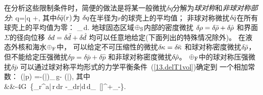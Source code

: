 在分析这些限制条件时，简便的做法是将某一般微扰$\delta q$分解为{\em 球对称\/}和{\em 非球对称部分\/}:
%
%
\eq
\delta\hspace{-0.1 mm}q=\delta\hspace{-0.1 mm}\bar{q}
+\delta\hspace{-0.1 mm},
\en
其中$\delta\hspace{-0.1 mm}\bar{q}(r)$为
$\delta\hspace{-0.1 mm}q$在半径为$r$的球壳上的平均值；
非球对称微扰$\delta\hspace{-0.1 mm}\hat{q}$在所有球壳上的平均值为零：
\eq
\int_{\Omega}\delta\hspace{-0.1 mm}\,d.
\en
地球固态区域$\earth_{\rm S}$内部的密度微扰
$\delta\hspace{-0.2 mm}\rho=\delta\hspace{-0.2 mm}\bar{\rho}
+\delta\hspace{-0.2 mm}\hat{\rho}$
和界面$\Sigma$的径向位移
$\delta\hspace{-0.1 mm}d=\delta\hspace{-0.1 mm}\bar{d}
+\delta\hspace{-0.1 mm}\hat{d}$
均可以任意地给定(下面列出的特殊情况除外)。
在液态外核和海水$\earth_{\rm F}$中，
可以给定不可压缩性的微扰$\delta\hspace{-0.2 mm}\kappa=\delta\hspace{-0.2 mm}\bar{\kappa}$
和球对称密度微扰$\delta\hspace{-0.2 mm}\bar{\rho}$，
但不能给定压强微扰$\delta p=\delta\bar{p}+\delta\hat{p}$
和非球对称密度微扰$\delta\hspace{-0.2 mm}\hat{\rho}$。
$\earth_{\rm F}$中的球对称压强微扰$\delta\bar{p}$
可以通过球对称平均形式的力学平衡条件~(\ref{13.delT1vol})确定到
一个相加常数：
\eq
\label{13.corepbar}
(\delta\bar{p})
=-(\delta\hspace{-0.2 mm}\bar{\rho})_{\,}g-
\rho{}(\delta\bar{\Phi}),
\en
其中
\eqa
{} \nonumber \\
&&\mbox{}\qquad\qquad\frac{}{}-4\pi G\,
\Bigg\{\int_r^a\delta\hspace{-0.2 mm}\bar{\rho}\,r\,dr
-\sum_{d\geq r}\delta\hspace{-0.1 mm}\bar{d}\,d_{\,}
[\rho]^+_-\Bigg\}.
